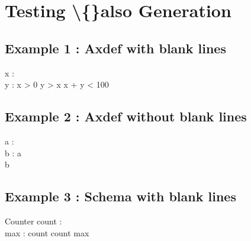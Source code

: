 \documentclass[a4paper,10pt,fleqn]{article}
\begin{document}
\section*{Testing \textbackslash\{\}also Generation}

\subsection*{Example 1 : Axdef with blank lines}

\begin{axdef}
x : \nat \\
y : \nat
\where
x > 0
\also
y > x
\also
x + y < 100
\end{axdef}

\subsection*{Example 2 : Axdef without blank lines}

\begin{axdef}
a : \nat \\
b : \nat
\where
a  \\
b 
\end{axdef}

\subsection*{Example 3 : Schema with blank lines}

\begin{schema}{Counter}
count : \nat \\
max : \nat
\where
count 
\also
count \leq max
\end{schema}
\end{document}
